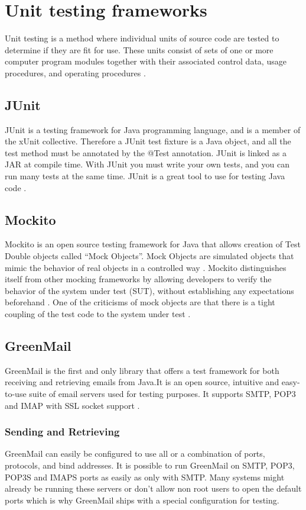 \section{Unit testing frameworks}

Unit testing is a method where individual units of source code are tested to determine if they are fit for use. These units consist of sets of one or more computer program modules together with their associated control data, usage procedures, and operating procedures \cite{bib:kolawa}.

\subsection{JUnit}
JUnit is a testing framework for Java programming language, and is a member of the xUnit collective. Therefore a JUnit test fixture is a Java object, and all the test method must be annotated by the @Test annotation. JUnit is linked as a JAR at compile time. With JUnit you must write your own tests, and you can run many tests at the same time. JUnit is a great tool to use for testing Java code \cite{bib:junit}.

\subsection{Mockito}
Mockito is an open source testing framework for Java that allows creation of Test Double objects called “Mock Objects”. Mock Objects are simulated objects that mimic the behavior of real objects in a controlled way \cite{bib:mock}.
\newline
\newline
Mockito distinguishes itself from other mocking frameworks by allowing developers to verify the behavior of the system under test (SUT), without establishing any expectations beforehand \cite{bib:mockito}.
One of the criticisms of mock objects are that there is a tight coupling of the test code to the system under test \cite{bib:mocks}.

\subsection{GreenMail}
GreenMail is the first and only library that offers a test framework for both receiving and retrieving emails from Java.It is an open source, intuitive and easy-to-use suite of email servers used for testing purposes. It supports SMTP, POP3 and IMAP with SSL socket support \cite{bib:greenmail}.


\subsubsection{Sending and Retrieving}
GreenMail can easily be configured to use all or a combination of ports, protocols, and bind addresses. It  is possible to run GreenMail on SMTP, POP3, POP3S and IMAPS ports as easily as only with SMTP. Many systems might already be running these servers or don’t allow non root users to open the default ports which is why GreenMail ships with a special configuration for testing.

\newpage